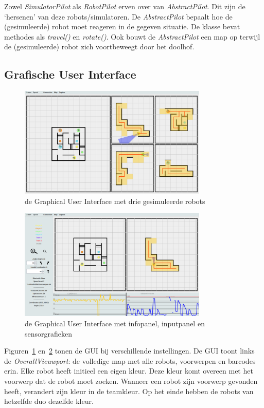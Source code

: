 \documentclass[tt3]{penoverslag}
\begin{document}
 Zowel \textit{SimulatorPilot} als \textit{RobotPilot} erven over van \textit{AbstractPilot}. Dit zijn de `hersenen' van deze robots/simulatoren. De \textit{AbstractPilot} bepaalt hoe de (gesimuleerde) robot moet reageren in de gegeven situatie. De klasse bevat methodes als \textit{travel()} en \textit{rotate()}. Ook bouwt de \textit{AbstractPilot} een map op terwijl de (gesimuleerde) robot zich voortbeweegt door het doolhof.

\subsection{Grafische User Interface}
\label{ssec:GUI}

\begin{figure}[h]
\centering
	\includegraphics[width=0.8\textwidth]{GUI1}
\caption{de Graphical User Interface met drie gesimuleerde robots}
\label{fig:GUI1}
\end{figure}

\begin{figure}[h]
\centering
	\includegraphics[width=0.8\textwidth]{GUI2}
\caption{de Graphical User Interface met infopanel, inputpanel en sensorgrafieken}
\label{fig:GUI2}
\end{figure}

Figuren~\ref{fig:GUI1} en~\ref{fig:GUI2} tonen de GUI bij verschillende instellingen. De GUI toont links de \textit{OverallVieuwport}: de volledige map met alle robots, voorwerpen en barcodes erin. Elke robot heeft initieel een eigen kleur. Deze kleur komt overeen met het voorwerp dat de robot moet zoeken. Wanneer een robot zijn voorwerp gevonden heeft, verandert zijn kleur in de teamkleur. Op het einde hebben de robots van hetzelfde duo dezelfde kleur.\\
\end{document}
